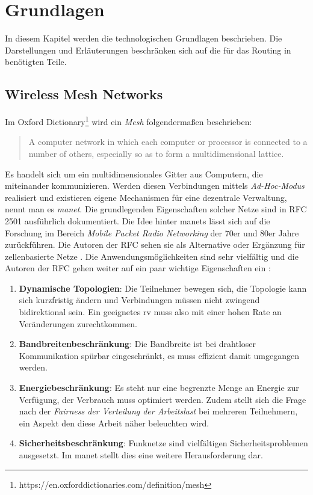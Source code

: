 
\chapter{Grundlagen}
\label{chapter:grundlagen}

In diesem Kapitel werden die technologischen Grundlagen beschrieben. Die Darstellungen und Erläuterungen beschränken sich auf die für das Routing in  benötigten Teile. 

\section{Wireless Mesh Networks}
\label{chapter:grundlagen:wmn}

Im Oxford Dictionary\footnote{https://en.oxforddictionaries.com/definition/mesh} wird ein \textit{Mesh} folgendermaßen beschrieben:

\begin{quote}
\glqq A computer network in which each computer or processor is connected to a number of others, especially so as to form a multidimensional lattice.\grqq
\end{quote}

Es handelt sich um ein multidimensionales Gitter aus Computern, die miteinander kommunizieren. Werden diesen Verbindungen mittels \textit{Ad-Hoc-Modus} realisiert und existieren eigene Mechanismen für eine dezentrale Verwaltung, nennt man es \textit{\gls{manet}}. Die grundlegenden Eigenschaften solcher Netze sind in RFC 2501 \cite{RFC2501} ausführlich dokumentiert. Die Idee hinter \glspl{manet} lässt sich auf die Forschung im Bereich \textit{Mobile Packet Radio Networking} der 70er und 80er Jahre zurückführen. Die Autoren der RFC sehen sie als Alternative oder Ergänzung für zellenbasierte Netze \cite{RFC2501}. Die Anwendungsmöglichkeiten sind sehr vielfältig und die Autoren der RFC gehen weiter auf ein paar wichtige Eigenschaften ein \cite{RFC2501}:

\begin{enumerate}
\item \textbf{Dynamische Topologien}: Die Teilnehmer bewegen sich, die Topologie kann sich kurzfristig ändern und Verbindungen müssen nicht zwingend bidirektional sein. Ein geeignetes \gls{rv} muss also mit einer hohen Rate an Veränderungen zurechtkommen.
\item \textbf{Bandbreitenbeschränkung}: Die Bandbreite ist bei drahtloser Kommunikation spürbar eingeschränkt, es muss effizient damit umgegangen werden.
\item \textbf{Energiebeschränkung}: Es steht nur eine begrenzte Menge an Energie zur Verfügung, der Verbrauch muss optimiert werden. Zudem stellt sich die Frage nach der \textit{Fairness der Verteilung der Arbeitslast} bei mehreren Teilnehmern, ein Aspekt den diese Arbeit näher beleuchten wird.
\item \textbf{Sicherheitsbeschränkung}: Funknetze sind vielfältigen Sicherheitsproblemen ausgesetzt. Im \gls{manet} stellt dies eine weitere Herausforderung dar.
\end{enumerate}

